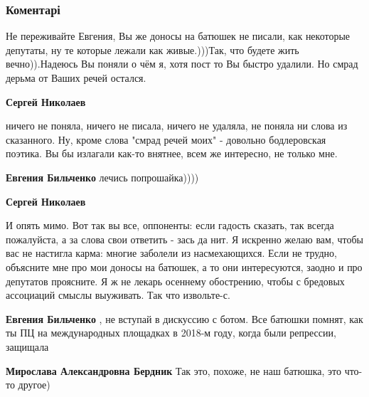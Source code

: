  
 
 
 
 
\subsubsection{Коментарі}

\begin{itemize} %

Не переживайте Евгения, Вы же доносы на батюшек не писали, как некоторые
депутаты, ну те которые лежали как живые.)))Так, что будете жить вечно)).Надеюсь
Вы поняли о чём я, хотя пост то Вы быстро удалили. Но смрад дерьма от Ваших речей
остался.

\begin{itemize} %
\textbf{Сергей Николаев} 

ничего не поняла, ничего не писала, ничего не удаляла, не поняла ни слова из
сказанного. Ну, кроме слова "смрад речей моих" - довольно бодлеровская поэтика.
Вы бы излагали как-то внятнее, всем же интересно, не только мне.

\textbf{Евгения Бильченко} лечись попрошайка))))

\textbf{Сергей Николаев} 

И опять мимо. Вот так вы все, оппоненты: если гадость сказать, так всегда
пожалуйста, а за слова свои ответить - зась да нит. Я искренно желаю вам, чтобы
вас не настигла карма: многие заболели из насмехающихся. Если не трудно,
объясните мне про мои доносы на батюшек, а то они интересуются, заодно и про
депутатов проясните. Я ж не лекарь осеннему обострению, чтобы с бредовых
ассоциаций смыслы выуживать. Так что извольте-с.


\textbf{Евгения Бильченко} , не вступай в дискуссию с ботом. Все батюшки помнят, как ты ПЦ на международных площадках в 2018-м году, когда были репрессии, защищала

\textbf{Мирослава Александровна Бердник} Так это, похоже, не наш батюшка, это что-то другое)
\end{itemize} %


\end{itemize}
